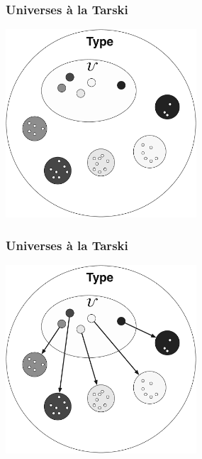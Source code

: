 \documentclass[12pt]{beamer}
\begin{document}
\begin{frame}
  \frametitle{Universes \`a la Tarski}
  \begin{center}
    \includegraphics[width=2.8in]{universe-populated.pdf}
  \end{center}
\end{frame}

\begin{frame}
  \frametitle{Universes \`a la Tarski}
  \begin{center}
    \includegraphics[width=2.8in]{universe-interpretation.pdf}
  \end{center}
\end{frame}
\end{document}
